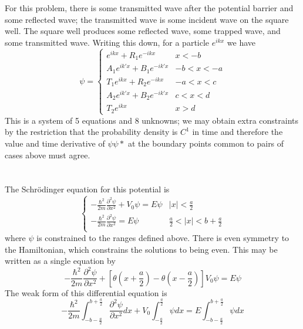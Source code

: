 \documentclass{article}
\begin{document}
\section{}
For this problem, there is some transmitted wave after the potential barrier and some reflected wave; the transmitted wave is some incident wave on the square well. The square well produces some reflected wave, some trapped wave, and some transmitted wave. Writing this down, for a particle $e^{ikx}$ we have
\[\psi=
  \begin{cases}
    e^{ikx}+R_{1}e^{-ikx} & x < -b \\
    A_{1}e^{ik'x}+B_{1}e^{-ik'x} & -b < x < -a\\
    T_{1}e^{ikx}+R_{2}e^{-ikx} & -a < x < c \\
    A_{2}e^{ik'x} + B_{2}e^{-ik'x} & c < x < d\\
    T_{2}e^{ikx} & x > d
  \end{cases}\]
This is a system of 5 equations and 8 unknowns; we may obtain extra constraints by the restriction that the probability density is $C^{1}$ in time and therefore the value and time derivative of $\psi\psi*$ at the boundary points common to pairs of cases above must agree.
\section{}
The Schr\"odinger equation for this potential is
\[
  \begin{cases}
    -\frac{\hbar^{2}}{2m}\frac{\partial^{2}\psi}{\partial x^{2}}+V_{0}\psi=E\psi & |x| < \frac{a}{2}\\
    -\frac{\hbar^{2}}{2m}\frac{\partial^{2}\psi}{\partial x^{2}}=E\psi & \frac{a}{2} < |x| < b+\frac{a}{2} \\
  \end{cases}
\]
where $\psi$ is constrained to the ranges defined above. There is even symmetry to the Hamiltonian, which constrains the solutions to being even.
This may be written as a single equation by
\[-\frac{\hbar^{2}}{2m}\frac{\partial^{2} \psi}{\partial x^{2}}+[\theta(x+\frac{a}{2})-\theta(x-\frac{a}{2})]V_{0}\psi=E\psi\]
The weak form of this differential equation is
\[-\frac{\hbar^{2}}{2m}\int_{-b-\frac{a}{2}}^{b+\frac{a}{2}}\frac{\partial^{2}\psi}{\partial x^{2}}dx+V_{0}\int_{-\frac{a}{2}}^{\frac{a}{2}}\psi dx=E\int_{-b-\frac{a}{2}}^{b+\frac{a}{2}}\psi dx\]
\end{document}
